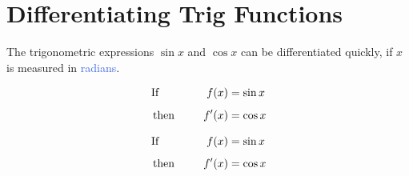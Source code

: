 \documentclass[
  11pt,
  openany]{book}
\begin{document}
\newpage

\section{Differentiating Trig Functions}\label{differentiating-trig-functions}

\vspace{-0.5cm}

The trigonometric expressions \(\sin{x}\) and \(\cos{x}\) can be differentiated quickly, if \(x\) is measured in \textcolor{RoyalBlue}{radians}.

\begin{figure}[H]
    \centering
    \begin{minipage}{7cm}
        \begin{tcolorbox}[colback=red!5,colframe=red!70!black,height=2.2cm,width=6.2cm]
            \vspace{-0.5cm}
            \begin{center}
                \begin{align*}
                    \text{If }\hspace{1.4cm} f(x)&=\sin{x}\\[0.5em]
                    \text{ then }\hspace{0.8cm} f'(x)&=\cos{x}
                \end{align*}
            \end{center}
        \end{tcolorbox}
    \end{minipage}%
    \begin{minipage}{1cm}
    \end{minipage}%
    \begin{minipage}{7cm}
        \begin{tcolorbox}[colback=red!5,colframe=red!70!black,height=2.2cm,width=6.2cm]
            \vspace{-0.5cm}
            \begin{center}
                \begin{align*}
                    \text{If }\hspace{1.4cm} f(x)&=\sin{x}\\[0.5em]
                    \text{ then }\hspace{0.8cm} f'(x)&=\cos{x}
                \end{align*}
            \end{center}
        \end{tcolorbox}
    \end{minipage}
\end{figure}
\end{document}
